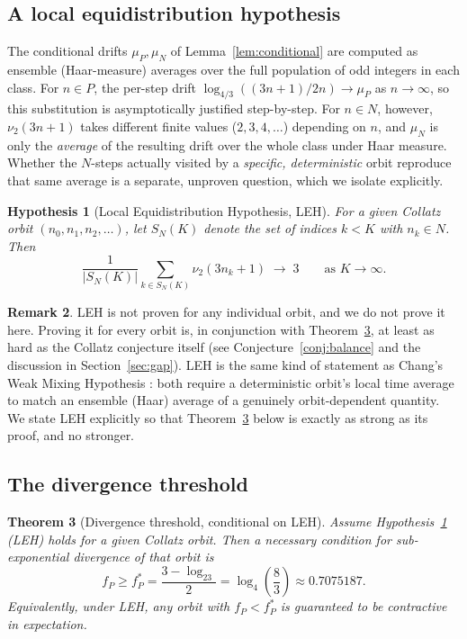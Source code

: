 \documentclass[12pt,reqno]{amsart}
\theoremstyle{plain}
\newtheorem{theorem}{Theorem}[section]
\newtheorem{hypothesis}[theorem]{Hypothesis}
\theoremstyle{definition}
\newtheorem{remark}[theorem]{Remark}
\newcommand{\nuTwo}{\nu_2}
\newcommand{\logtwo}{\log_2}
\newcommand{\logfour}{\log_4}
\newcommand{\fP}{f_P}
\newcommand{\fPstar}{f_P^*}
\newcommand{\muP}{\mu_P}
\newcommand{\muN}{\mu_N}
\begin{document}
\subsection{A local equidistribution hypothesis}

The conditional drifts $\muP, \muN$ of Lemma~\ref{lem:conditional} are computed
as ensemble (Haar-measure) averages over the full population of odd integers in
each class. For $n \in P$, the per-step drift $\log_{4/3}((3n+1)/2n) \to \muP$ as
$n \to \infty$, so this substitution is asymptotically justified step-by-step.
For $n \in N$, however, $\nuTwo(3n+1)$ takes different finite values ($2,3,4,\dots$)
depending on $n$, and $\muN$ is only the \emph{average} of the resulting drift over
the whole class under Haar measure. Whether the $N$-steps actually visited by a
\emph{specific, deterministic} orbit reproduce that same average is a separate,
unproven question, which we isolate explicitly.

\begin{hypothesis}[Local Equidistribution Hypothesis, LEH]\label{hyp:leh}
For a given Collatz orbit $(n_0, n_1, n_2, \dots)$, let $S_N(K)$ denote the set of
indices $k < K$ with $n_k \in N$. Then
\[
\frac{1}{|S_N(K)|} \sum_{k \in S_N(K)} \nuTwo(3n_k+1) \;\longrightarrow\; 3
\qquad \text{as } K \to \infty.
\]
\end{hypothesis}

\begin{remark}
LEH is not proven for any individual orbit, and we do not prove it here. Proving it
for every orbit is, in conjunction with Theorem~\ref{thm:threshold}, at least as hard
as the Collatz conjecture itself (see Conjecture~\ref{conj:balance} and the discussion
in Section~\ref{sec:gap}). LEH is the same kind of statement as Chang's Weak Mixing
Hypothesis \cite{chang2026paradigm}: both require a deterministic orbit's local time
average to match an ensemble (Haar) average of a genuinely orbit-dependent quantity.
We state LEH explicitly so that Theorem~\ref{thm:threshold} below is exactly as strong
as its proof, and no stronger.
\end{remark}

\subsection{The divergence threshold}

\begin{theorem}[Divergence threshold, conditional on LEH]\label{thm:threshold}
Assume Hypothesis~\ref{hyp:leh} (LEH) holds for a given Collatz orbit. Then a
necessary condition for sub-exponential divergence of that orbit is
\begin{equation}\label{eq:threshold-thm}
\fP \geq \fPstar = \frac{3 - \logtwo 3}{2} = \logfour\!\left(\frac{8}{3}\right) \approx 0.7075187.
\end{equation}
Equivalently, under LEH, any orbit with $\fP < \fPstar$ is guaranteed to be
contractive in expectation.
\end{theorem}
\end{document}
